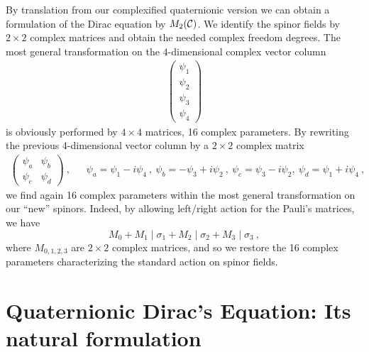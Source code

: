 By translation from our complexified quaternionic version we can obtain 
a formulation of the Dirac equation by $M_2({\cal C})$. We identify 
the spinor fields by $2\times 2$ complex 
matrices and  obtain the needed complex freedom degrees.
The most general transformation on the $4$-dimensional complex vector
column
\begin{eqnarray}
\label{vc}
\left( \begin{array}{c} 
       \psi_1 \\ \psi_2 \\ \psi_3 \\ \psi_4 
       \end{array}
\right)
\end{eqnarray}
is obviously performed by $4\times 4$ matrices, 16 complex parameters. By
rewriting  the previous 4-dimensional vector column by a $2\times 2$ 
complex matrix
\begin{eqnarray}
\label{m2}
\left( \begin{array}{cc}
       \psi_a & \psi_b \\ \psi_c & \psi_d
       \end{array}
\right)~,~~~~~~~\psi_a=\psi_1-i\psi_4~,~\psi_b=-\psi_3+i\psi_2~,
               ~\psi_c=\psi_3-i\psi_2,~\psi_d=\psi_1+i\psi_4~,
\end{eqnarray}
we find again 16 complex parameters within the most general transformation
on our ``new'' spinors. Indeed, by allowing left/right action for the Pauli's 
matrices, we have
\[ M_0 + M_1 \mid \sigma_1 + M_2 \mid \sigma_2 + M_3 \mid \sigma_3~,\]
where $M_{0,1,2,3}$ are $2\times 2$ complex matrices, 
and so we restore the 16 complex parameters characterizing the 
standard action on spinor fields.






\section{Quaternionic Dirac's Equation: Its natural formulation}
\label{s4}



